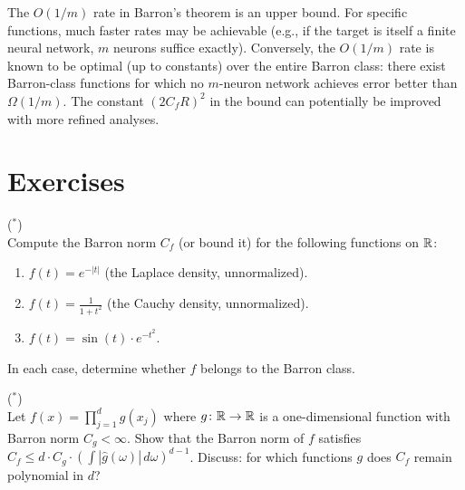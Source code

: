 \documentclass[11pt,a4paper]{article}
\begin{document}
\begin{warning}[title={Barron's Bound Is Not Tight in General}]
The $O(1/m)$ rate in Barron's theorem is an upper bound.  For specific
functions, much faster rates may be achievable (e.g., if the target is
itself a finite neural network, $m$ neurons suffice exactly).
Conversely, the $O(1/m)$ rate is known to be optimal (up to constants)
over the entire Barron class: there exist Barron-class functions for
which no $m$-neuron network achieves error better than $\Omega(1/m)$.
The constant $(2C_fR)^2$ in the bound can potentially be improved
with more refined analyses.
\end{warning}

\section{Exercises}
\label{sec:exercises}

\begin{exercise}
\textnormal{(\({}^*\))} \\
Compute the Barron norm $C_f$ (or bound it) for the following functions
on $\mathbb{R}$:
\begin{enumerate}[label=(\alph*)]
  \item $f(t) = e^{-|t|}$ (the Laplace density, unnormalized).
  \item $f(t) = \frac{1}{1+t^2}$ (the Cauchy density, unnormalized).
  \item $f(t) = \sin(t) \cdot e^{-t^2}$.
\end{enumerate}
In each case, determine whether $f$ belongs to the Barron class.
\end{exercise}

\begin{exercise}
\textnormal{(\({}^*\))} \\
Let $f(x) = \prod_{j=1}^d g(x_j)$ where $g \colon \mathbb{R} \to \mathbb{R}$ is a
one-dimensional function with Barron norm $C_g < \infty$.  Show that the
Barron norm of $f$ satisfies $C_f \le d \cdot C_g \cdot
(\int |\hat{g}(\omega)| \, d\omega)^{d-1}$.  Discuss: for which functions
$g$ does $C_f$ remain polynomial in $d$?
\end{exercise}
\end{document}
